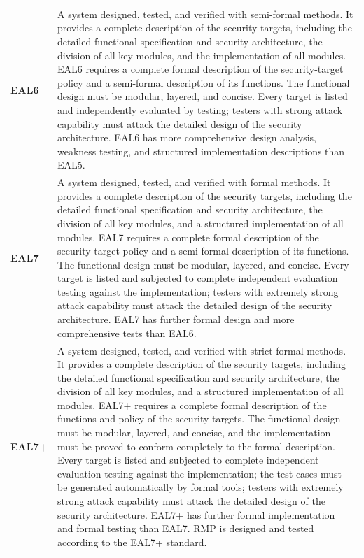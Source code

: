 \begin{table}[htbp]
\begin{tabularx}{\textwidth}{@{}>{\sffamily\bfseries\color{rmppurple}}p{1.2cm} X@{}}
        EAL6 & A system designed, tested, and verified with semi-formal methods. It provides a complete description of the security targets, including the detailed functional specification and security architecture, the division of all key modules, and the implementation of all modules. EAL6 requires a complete formal description of the security-target policy and a semi-formal description of its functions. The functional design must be modular, layered, and concise. Every target is listed and independently evaluated by testing; testers with strong attack capability must attack the detailed design of the security architecture. EAL6 has more comprehensive design analysis, weakness testing, and structured implementation descriptions than EAL5.\\
        EAL7 & A system designed, tested, and verified with formal methods. It provides a complete description of the security targets, including the detailed functional specification and security architecture, the division of all key modules, and a structured implementation of all modules. EAL7 requires a complete formal description of the security-target policy and a semi-formal description of its functions. The functional design must be modular, layered, and concise. Every target is listed and subjected to complete independent evaluation testing against the implementation; testers with extremely strong attack capability must attack the detailed design of the security architecture. EAL7 has further formal design and more comprehensive tests than EAL6.\\
        EAL7+ & A system designed, tested, and verified with strict formal methods. It provides a complete description of the security targets, including the detailed functional specification and security architecture, the division of all key modules, and a structured implementation of all modules. EAL7+ requires a complete formal description of the functions and policy of the security targets. The functional design must be modular, layered, and concise, and the implementation must be proved to conform completely to the formal description. Every target is listed and subjected to complete independent evaluation testing against the implementation; the test cases must be generated automatically by formal tools; testers with extremely strong attack capability must attack the detailed design of the security architecture. EAL7+ has further formal implementation and formal testing than EAL7. RMP is designed and tested according to the EAL7+ standard.\\
        \bottomrule
    \end{tabularx}
\end{table}

